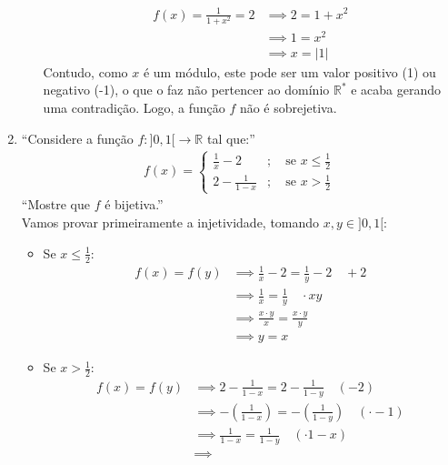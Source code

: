 \documentclass[13pt,letterpaper]{article}
\begin{document}
\begin{enumerate}
\begin{enumerate}
        \begin{align*}
            f(x) = \frac{1}{1 + x^2} = 2 &\implies 2 = 1 + x^2 \\ &\implies
            1 = x^2 \\ &\implies
            x = |1|
        \end{align*}
        Contudo, como $x$ é um módulo, este pode ser um valor positivo (1) ou negativo (-1), o que o faz não pertencer ao domínio $\mathbb{R}^*$ e acaba gerando uma contradição. Logo, a função $f$ não é sobrejetiva.        
    \end{enumerate}
    \item \enquote{Considere a função $f: ]0, 1[ \rightarrow \mathbb{R}$ tal que:}
        \begin{align*}
            f(x) = \left\{
                    \begin{aligned}
                        \frac{1}{x} - 2 &; \quad \text{se $x \le \frac{1}{2}$} \\
                        2 - \frac{1}{1 - x} &; \quad \text{se $x > \frac{1}{2}$}
                    \end{aligned}
                    \right. 
        \end{align*}
    \enquote{Mostre que $f$ é bijetiva.}\\
    Vamos provar primeiramente a injetividade, tomando $x, y \in ]0, 1[$: 
    \begin{itemize}
        \item Se $x \le \frac{1}{2}$: \\
            \begin{align*}
                f(x) = f(y) &\implies \frac{1}{x} - 2 = \frac{1}{y} - 2 \quad +2 \\ &\implies
                \frac{1}{x} = \frac{1}{y} \quad \cdot xy \\ &\implies
                \frac{x \cdot y}{x} = \frac{x \cdot y}{y} \\ &\implies
                y = x
            \end{align*}
        \item Se $x > \frac{1}{2}$: \\
            \begin{align*}
                f(x) = f(y) &\implies 2 - \frac{1}{1 - x} = 2 - \frac{1}{1 - y} \quad (-2) \\ &\implies
                -(\frac{1}{1 - x}) = -(\frac{1}{1 - y}) \quad (\cdot -1) \\ &\implies
                \frac{1}{1 - x} = \frac{1}{1 - y} \quad (\cdot 1 - x) \\ &\implies

\end{align*}
\end{itemize}
\end{enumerate}
\end{document}
